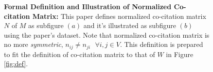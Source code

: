 \begin{figure}[ht]
    \caption{\textbf{Formal Definition and Illustration of Normalized Co-citation Matrix:} This paper defines normalized co-citation matrix $N$ of $M$ as subfigure $(a)$ and it's illustrated as subfigure $(b)$ using the paper's dataset. Note that normalized co-citation matrix is no more \textit{symmetric}, $n_{ij} \neq n_{ji} \text{ } \forall i,j \in V$. This definition is prepared to fit the definition of co-citation matrix to that of $W$ in Figure \ref{fig:def}.}
    \label{fig:collected:preds}
\end{figure}